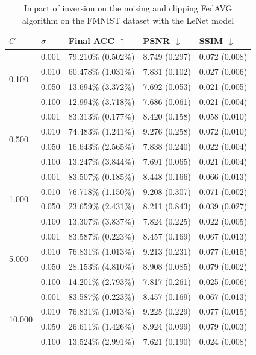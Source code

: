 \documentclass[conference,compsoc]{IEEEtran}
\begin{document}
\begin{table}[H]
\centering
\caption{Impact of inversion on the noising and clipping FedAVG algorithm on the FMNIST dataset with the LeNet model}
\label{table:dp_fmnist_lenet}
\begin{tabular}{lllll}
\hline
$C$ & $\sigma$ & \textbf{Final ACC} $\uparrow$ & \textbf{PSNR} $\downarrow$ & \textbf{SSIM} $\downarrow$ \\
\hline
\multirow{4}{*}{0.100} & 0.001 & 79.210\% (0.502\%) & 8.749 (0.297) & 0.072 (0.008) \\
& 0.010 & 60.478\% (1.031\%) & 7.831 (0.102) & 0.027 (0.006) \\
& 0.050 & 13.694\% (3.372\%) & 7.692 (0.053) & 0.021 (0.005) \\
& 0.100 & 12.994\% (3.718\%) & 7.686 (0.061) & 0.021 (0.004) \\
\hline
\multirow{4}{*}{0.500} & 0.001 & 83.313\% (0.177\%) & 8.420 (0.158) & 0.058 (0.010) \\
& 0.010 & 74.483\% (1.241\%) & 9.276 (0.258) & 0.072 (0.010) \\
& 0.050 & 16.643\% (2.565\%) & 7.838 (0.240) & 0.022 (0.004) \\
& 0.100 & 13.247\% (3.844\%) & 7.691 (0.065) & 0.021 (0.004) \\
\hline
\multirow{4}{*}{1.000} & 0.001 & 83.507\% (0.185\%) & 8.448 (0.166) & 0.066 (0.013) \\
& 0.010 & 76.718\% (1.150\%) & 9.208 (0.307) & 0.071 (0.002) \\
& 0.050 & 23.659\% (2.431\%) & 8.211 (0.843) & 0.039 (0.027) \\
& 0.100 & 13.307\% (3.837\%) & 7.824 (0.225) & 0.022 (0.005) \\
\hline
\multirow{4}{*}{5.000} & 0.001 & 83.587\% (0.223\%) & 8.457 (0.169) & 0.067 (0.013) \\
& 0.010 & 76.831\% (1.013\%) & 9.213 (0.231) & 0.077 (0.015) \\
& 0.050 & 28.153\% (4.810\%) & 8.908 (0.085) & 0.079 (0.002) \\
& 0.100 & 14.201\% (2.793\%) & 7.817 (0.261) & 0.025 (0.006) \\
\hline
\multirow{4}{*}{10.000} & 0.001 & 83.587\% (0.223\%) & 8.457 (0.169) & 0.067 (0.013) \\
& 0.010 & 76.831\% (1.013\%) & 9.225 (0.229) & 0.077 (0.015) \\
& 0.050 & 26.611\% (1.426\%) & 8.924 (0.099) & 0.079 (0.003) \\
& 0.100 & 13.524\% (2.991\%) & 7.621 (0.190) & 0.024 (0.008) \\
\hline
\end{tabular}
\end{table}
\end{document}
